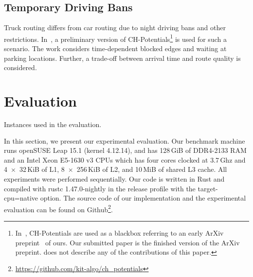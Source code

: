 \documentclass[a4paper,UKenglish,cleveref, autoref, thm-restate]{lipics-v2021}
\begin{document}
\subsection{Temporary Driving Bans}

Truck routing differs from car routing due to night driving bans and other restrictions.
In~\cite{kswz-erptd-p-20}, a preliminary version of CH-Potentials\footnote{
In~\cite{kswz-erptd-p-20}, CH-Potentials are used as a blackbox referring to an early ArXiv preprint~\cite{strasser2019perfect} of ours.
Our submitted paper is the finished version of the ArXiv preprint.
\cite{kswz-erptd-p-20} does not describe any of the contributions of this paper.
} is used for such a scenario.
The work considers time-dependent blocked edges and waiting at parking locations.
Further, a trade-off between arrival time and route quality is considered.

\section{Evaluation}

\label{sec:experiments}

\begin{table}
\centering
\caption{Instances used in the evaluation.}\label{tab:graphs}

\end{table}

In this section, we present our experimental evaluation.
Our benchmark machine runs openSUSE Leap 15.1 (kernel 4.12.14), and has 128\,GiB of DDR4-2133 RAM and an Intel Xeon E5-1630 v3 CPUs which has four cores clocked at 3.7\,Ghz and 4~$\times$~32\,KiB of L1, 8~$\times$~256\,KiB of L2, and 10\,MiB of shared L3 cache.
All experiments were performed sequentially.
Our code is written in Rust and compiled with rustc 1.47.0-nightly in the release profile with the target-cpu=native option.
The source code of our implementation and the experimental evaluation can be found on Github\footnote{\url{https://github.com/kit-algo/ch_potentials}}.
\end{document}
